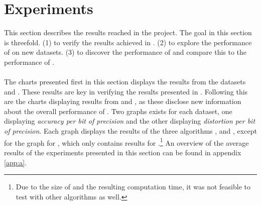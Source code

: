 \section{Experiments} %
\label{results}
This section describes the results reached in the project. The goal in this section is threefold. (1) to verify the results achieved in \cite{wagner17}. (2) to explore the performance of \qs{} on new datasets. (3) to discover the performance of \qsr{} and compare this to the performance of \qs{}.
\\
\\
The charts presented first in this section displays the results from the datasets \sift{} and \mnist{}. These results are key in verifying the results presented in \cite{wagner17}. Following this are the charts displaying results from \clust{} and \gist{}, as these disclose new information about the overall performance of \qs{}. Two graphs exists for each dataset, one displaying \textit{accuracy per bit of precision} and the other displaying \textit{distortion per bit of precision}. Each graph displays the results of the three algorithms \qs{}, \qsr{} and \grid{}, except for the graph for \gist{}, which only contains results for \qs{}.\footnote{Due to the size of \gist{} and the resulting computation time, it was not feasible to test with other algorithms as well.} An overview of the average results of the experiments presented in this section can be found in appendix \ref{app:a}.

